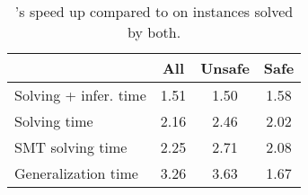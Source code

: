 \begin{table}[t]
  \centering
  \small
  \renewcommand{\arraystretch}{1.2}
\begin{tabular}{@{}lccc@{}}\toprule
    & All & Unsafe & Safe\\
  \midrule
    Solving + infer. time & 1.51 & 1.50 & 1.58\\
    Solving time & 2.16 & 2.46 & 2.02\\
    SMT solving time & 2.25&2.71&2.08\\
    Generalization time & 3.26& 3.63 & 1.67\\
    \bottomrule
\end{tabular}
\caption{\dpy's speed up compared to \spc on instances solved by both.}
\label{tab:dpy_vs_spc}
\end{table}
